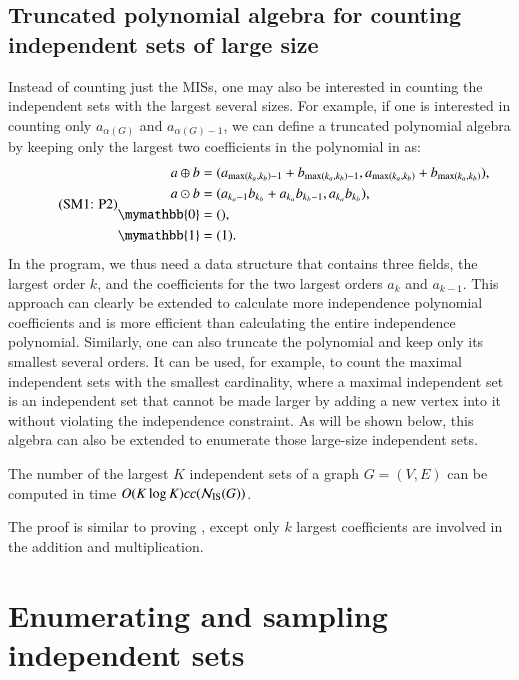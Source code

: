 \documentclass[review, onefignum, onetabnum]{siamart190516}
\begin{document}
\subsection{Truncated polynomial algebra for counting independent sets of large size}
Instead of counting just the MISs, one may also be interested in counting the independent sets with the largest several sizes.
For example, if one is interested in counting only $a_{\alpha(G)}$ and $a_{\alpha(G)-1}$, we can define a truncated polynomial algebra by keeping only the largest two coefficients in the polynomial in  as:
\begin{equation}
    \eqname{P2}
    \begin{split}
    a \oplus b &= (a_{\max(k_a, k_b)-1} + b_{\max(k_a, k_b)-1}, a_{\max(k_a, k_b)} + b_{\max(k_a, k_b)}),\\
    a \odot b &= (a_{k_a-1} b_{k_b}+a_{k_a} b_{k_b-1}, a_{k_a} b_{k_b}),\\
    \mymathbb{0} &= (), \\
    \mymathbb{1} &= (1).\label{eq:max2poly}
    \end{split}
\end{equation}
In the program, we thus need a data structure that contains three fields, the largest order $k$, and the coefficients for the two largest orders $a_k$ and $a_{k-1}$.
This approach can clearly be extended to calculate more independence polynomial coefficients and is more efficient than calculating the entire independence polynomial.
Similarly, one can also truncate the polynomial and keep only its smallest several orders.
It can be used, for example, to count the maximal independent sets with the smallest cardinality, where a maximal independent set is an independent set that cannot be made larger by adding a new vertex into it without violating the independence constraint.
As will be shown below, this algebra can also be extended to enumerate those large-size independent sets.

\begin{theorem}
    The number of the largest $K$ independent sets of a graph $G = (V, E)$ can be computed in time $O(K\log K)cc({\mathcal{N}_{\rm IS}(G)})$.
\end{theorem}
The proof is similar to proving , except only $k$ largest coefficients are involved in the addition and multiplication.

\section{Enumerating and sampling independent sets}\label{sec:enumeration}
\end{document}
